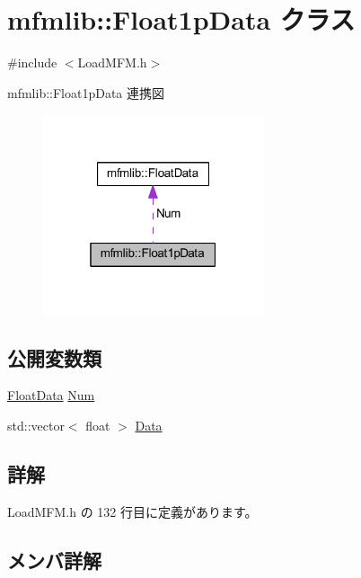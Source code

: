\hypertarget{classmfmlib_1_1_float1p_data}{}\section{mfmlib\+:\+:Float1p\+Data クラス}
\label{classmfmlib_1_1_float1p_data}


{\ttfamily \#include $<$Load\+M\+F\+M.\+h$>$}



mfmlib\+:\+:Float1p\+Data 連携図\nopagebreak
\begin{figure}[H]
\begin{center}
\leavevmode
\includegraphics[width=184pt]{classmfmlib_1_1_float1p_data__coll__graph}
\end{center}
\end{figure}
\subsection*{公開変数類}
\begin{DoxyCompactItemize}
\item 
\mbox{\hyperlink{classmfmlib_1_1_float_data}{Float\+Data}} \mbox{\hyperlink{classmfmlib_1_1_float1p_data_a6672d2c3f3e05965772b92524f27db15}{Num}}
\item 
std\+::vector$<$ float $>$ \mbox{\hyperlink{classmfmlib_1_1_float1p_data_adb6b956878dc0346e374bb89f74c10fd}{Data}}
\end{DoxyCompactItemize}


\subsection{詳解}


 Load\+M\+F\+M.\+h の 132 行目に定義があります。



\subsection{メンバ詳解}
\mbox{\label{classmfmlib_1_1_float1p_data_adb6b956878dc0346e374bb89f74c10fd}} 
